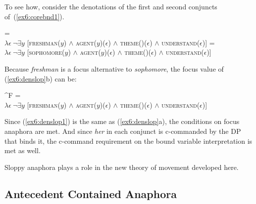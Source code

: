 To see how, consider the denotations of the first and second conjuncts of~(\ref{ex6:corebnd1}).
\begin{exe}
	\raggedright
	\ex \label{ex6:denslop}
	\begin{xlist}
		\ex {} =\\
		$\lambda \epsilon\ \neg \exists y$ [\textsc{freshman}($y$) $\wedge$ \textsc{agent}($y$)($\epsilon$) $\wedge$ \textsc{theme}()($\epsilon$) $\wedge$ \textsc{understand}($\epsilon$)]
		\ex {} =\\
		$\lambda \epsilon\ \neg \exists y$ [\textsc{sophomore}($y$) $\wedge$ \textsc{agent}($y$)($\epsilon$) $\wedge$ \textsc{theme}()($\epsilon$) $\wedge$ \textsc{understand}($\epsilon$)]
	\end{xlist}
\end{exe}
Because \emph{freshman} is a focus alternative to \emph{sophomore}, the focus value of (\ref{ex6:denslop}b) can be:
\begin{exe}
	\raggedright
	\ex \label{ex6:denslop1}
	^F =\\
			$\lambda \epsilon\ \neg \exists y$ [\textsc{freshman}($y$) $\wedge$ \textsc{agent}($y$)($\epsilon$) $\wedge$ \textsc{theme}()($\epsilon$) $\wedge$ \textsc{understand}($\epsilon$)]
\end{exe}
Since (\ref{ex6:denslop1}) is the same as (\ref{ex6:denslop}a), the conditions on focus anaphora are met. And since \emph{her} in each conjunct is c-commanded by the DP that binds it, the c-command requirement on the bound variable interpretation is met as well.

Sloppy anaphora plays a role in the new theory of movement developed here.

\subsection{Antecedent Contained Anaphora} 
\label{sec:acd}

